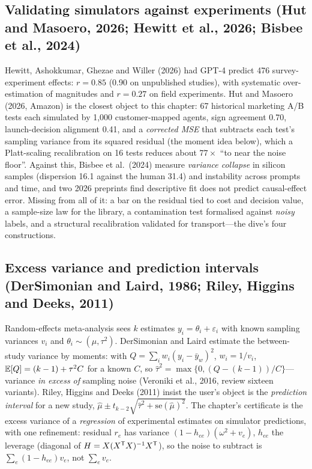 \subsection{Validating simulators against experiments (Hut and Masoero, 2026; Hewitt et al., 2026; Bisbee et al., 2024)}

Hewitt, Ashokkumar, Ghezae and Willer (2026) had GPT-4 predict 476 survey-experiment effects: $r = 0.85$ (0.90 on unpublished studies), with systematic over-estimation of magnitudes and $r = 0.27$ on field experiments. Hut and Masoero (2026, Amazon) is the closest object to this chapter: 67 historical marketing A/B tests each simulated by 1,000 customer-mapped agents, sign agreement 0.70, launch-decision alignment 0.41, and a \emph{corrected MSE} that subtracts each test's sampling variance from its squared residual (the moment idea below), which a Platt-scaling recalibration on 16 tests reduces about $77\times$ ``to near the noise floor''. Against this, Bisbee et al.\ (2024) measure \emph{variance collapse} in silicon samples (dispersion 16.1 against the human 31.4) and instability across prompts and time, and two 2026 preprints find descriptive fit does not predict causal-effect error. Missing from all of it: a bar on the residual tied to cost and decision value, a sample-size law for the library, a contamination test formalised against \emph{noisy} labels, and a structural recalibration validated for transport---the dive's four constructions.

\subsection{Excess variance and prediction intervals (DerSimonian and Laird, 1986; Riley, Higgins and Deeks, 2011)}

Random-effects meta-analysis sees $k$ estimates $y_i = \theta_i + \varepsilon_i$ with known sampling variances $v_i$ and $\theta_i \sim (\mu, \tau^2)$. DerSimonian and Laird estimate the between-study variance by moments: with $Q = \sum_i w_i(y_i - \bar y_w)^2$, $w_i = 1/v_i$, $\mathbb{E}[Q] = (k - 1) + \tau^2 C$ for a known $C$, so $\hat\tau^2 = \max\{0, (Q - (k-1))/C\}$---variance \emph{in excess of} sampling noise (Veroniki et al., 2016, review sixteen variants). Riley, Higgins and Deeks (2011) insist the user's object is the \emph{prediction interval} for a new study, $\hat\mu \pm t_{k-2}\sqrt{\hat\tau^2 + \mathrm{se}(\hat\mu)^2}$. The chapter's certificate is the excess variance of a \emph{regression} of experimental estimates on simulator predictions, with one refinement: residual $r_e$ has variance $(1 - h_{ee})(\omega^2 + v_e)$, $h_{ee}$ the leverage (diagonal of $H = X(X^{\mathsf{T}} X)^{-1}X^{\mathsf{T}}$), so the noise to subtract is $\sum_e (1 - h_{ee}) v_e$, not $\sum_e v_e$.

